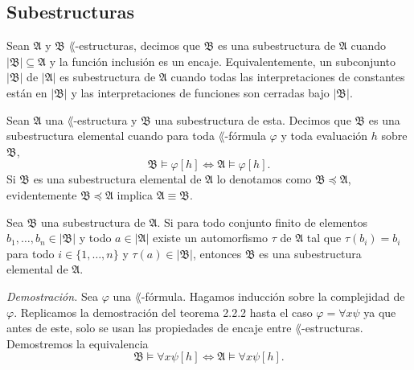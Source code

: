 \subsection{Subestructuras}
\begin{definition}
  Sean $\mathfrak{A}$ y $\mathfrak{B}$ $\lang$-estructuras, decimos que $\mathfrak{B}$ es una subestructura de $\mathfrak{A}$ cuando $|\mathfrak{B}| \subseteq \mathfrak{A}$ y la funci\'on inclusi\'on es un encaje. \hfill \break
  Equivalentemente, un subconjunto $|\mathfrak{B}|$ de $|\mathfrak{A}|$ es subestructura de $\mathfrak{A}$ cuando todas las interpretaciones de constantes est\'an en $|\mathfrak{B}|$ y las interpretaciones de funciones son cerradas bajo $|\mathfrak{B}|$.
\end{definition}
\begin{definition}
  Sean $\mathfrak{A}$ una $\lang$-estructura y $\mathfrak{B}$ una subestructura de esta.
  Decimos que $\mathfrak{B}$ es una subestructura elemental cuando para toda $\lang$-f\'ormula $\varphi$ y toda evaluaci\'on $h$ sobre $\mathfrak{B}$, 
  \[ \mathfrak{B} \models \varphi [h] \iff \mathfrak{A} \models \varphi [h]. \]
  Si $\mathfrak{B}$ es una subestructura elemental de $\mathfrak{A}$ lo denotamos como $\mathfrak{B} \preceq \mathfrak{A}$, evidentemente $\mathfrak{B} \preceq \mathfrak{A}$ implica $\mathfrak{A} \equiv \mathfrak{B}$.
\end{definition}
\begin{lemma}
  Sea $\mathfrak{B}$ una subestructura de $\mathfrak{A}$.
  Si para todo conjunto finito de elementos $b_1, \dots, b_n \in |\mathfrak{B}|$ y todo $a \in |\mathfrak{A}|$ existe un automorfismo $\tau$ de $\mathfrak{A}$ tal que $\tau(b_i) = b_i$ para todo $i \in \{ 1, \dots, n \}$ y $\tau(a) \in |\mathfrak{B}|$, entonces $\mathfrak{B}$ es una subestructura elemental de $\mathfrak{A}$. 
\end{lemma} \hfill \break
\emph{Demostraci\'on.} \hfill \break
Sea $\varphi$ una $\lang$-f\'ormula.
Hagamos inducci\'on sobre la complejidad de $\varphi$. \hfill \break
Replicamos la demostraci\'on del teorema 2.2.2 hasta el caso $\varphi = \forall x \psi$ ya que antes de este, solo se usan las propiedades de encaje entre $\lang$-estructuras. \hfill \break
Demostremos la equivalencia
\[ \mathfrak{B} \models \forall x \psi [h] \iff \mathfrak{A} \models \forall x \psi [h]. \]

